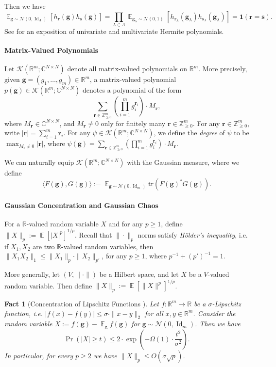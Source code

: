 \documentclass
[11pt,letterpaper]
{article}
\newtheorem{fact}[theorem]{Fact}
\theoremstyle{definition}
\newcommand{\cN}{\mathcal{N}}
\newcommand{\R}{{\mathbb R}}
\newcommand{\1}{\mathbf{1}}
\newcommand{\tr}{\mathrm{tr}}
\newcommand{\Z}{\mathbb Z}
\newcommand{\C}{\mathbb C}
\newcommand{\Id}{\operatorname{Id}}
\DeclareMathOperator*{\E}{\mathbb{E}}
\newcommand{\cK}{\mathcal K}
\renewcommand{\geq}{\geqslant}
\renewcommand{\leq}{\leqslant}
\begin{document}
Then we have 
\begin{equation}\label{eq:tuple-hermite-ortho}
    \E_{\bm{g}\sim\cN(0, \Id_\Lambda)}\left[h_{\bm{r}}(\bm{g})h_{\bm{s}}(\bm{g})\right] = \prod_{\lambda\in\Lambda}\E_{\bm{g}_\lambda\sim\cN(0, 1)}\left[h_{\bm{r}_\lambda}(\bm{g}_\lambda)h_{\bm{s}_\lambda}(\bm{g}_\lambda)\right] = \1(\bm{r} = \bm{s}).
\end{equation}
See \cite[Section~11.2]{ODonnell21} for an exposition of univariate and multivariate Hermite polynomials.

\paragraph{Matrix-Valued Polynomials} Let $\cK(\R^m;\C^{N\times N})$ denote all matrix-valued polynomials on $\R^m$. More precisely, given $\bm g = (g_1, \ldots, g_m)\in\R^m$, a matrix-valued polynomial $p(\bm g)\in\cK(\R^m;\C^{N\times N})$ denotes a polynomial of the form 
\[\sum_{\bm r\in\Z_{\geq 0}^m}\left(\prod_{i = 1}^m g_i^{\bm r_i}\right)\cdot M_{\bm r},\]
where $M_{\bm r}\in\C^{N\times N}$, and $M_{\bm r}\neq 0$ only for finitely many $\bm r\in\Z_{\geq 0}^m$. For any $\bm r\in\Z_{\geq 0}^m$, write $|\bm r| = \sum_{i = 1}^m\bm r_i$. For any $\psi\in\cK(\R^m;\C^{N\times N})$, we define the \emph{degree} of $\psi$ to be $\max_{M_{\bm r}\neq 0}|\bm r|$, where $\psi(\bm g) = \sum_{\bm r\in\Z_{\geq 0}^m}\left(\prod_{i = 1}^m g_i^{\bm r_i}\right)\cdot M_{\bm r}$. 

We can naturally equip $\cK(\R^m;\C^{N\times N})$ with the Gaussian measure, where we define 
\[\langle F(\bm g), G(\bm g)\rangle:= \E_{\bm g\sim\cN(0,\Id_m)}\tr(F(\bm g)^*G(\bm g)).\]

\paragraph{Gaussian Concentration and Gaussian Chaos}
For a $\R$-valued random variable $X$ and for any $p\geq 1$, define $\|X\|_{p}:= \E[|X|^p]^{1/p}$. Recall that $\|\cdot\|_p$ norms satisfy \emph{H\"{o}lder's inequality}, i.e. if $X_1, X_2$ are two $\R$-valued random variables, then $\|X_1X_2\|_1\leq\|X_1\|_p\cdot\|X_2\|_{p'}$, for any $p\geq 1$, where $p^{-1} + (p')^{-1} = 1$.

More generally, let $(V, \|\cdot\|)$ be a Hilbert space, and let $X$ be a $V$-valued random variable. Then define $\|X\|_p:= \E[\|X\|^p]^{1/p}$.
\begin{fact}[Concentration of Lipschitz Functions \cite{Vershynin18}]\label{fact:gaussian-lipschitz-conc}
Let $f:\R^m\to\R$ be a $\sigma$-Lipschitz function, i.e. $|f(x) - f(y)|\leq \sigma\cdot\|x - y\|_2$ for all $x, y\in\R^m$. Consider the random variable $X:= f(\bm g) - \E_{\bm g}f(\bm g)$ for $\bm g\sim\cN(0, \Id_m)$. Then we have 
\[\Pr\left(|X|\geq t\right)\leq 2\cdot\exp\left(-\Omega(1)\cdot\frac{t^2}{\sigma^2}\right).\]
In particular, for every $p\geq 2$ we have $\|X\|_p\leq O(\sigma\sqrt{p})$. 
\end{fact}
\end{document}
